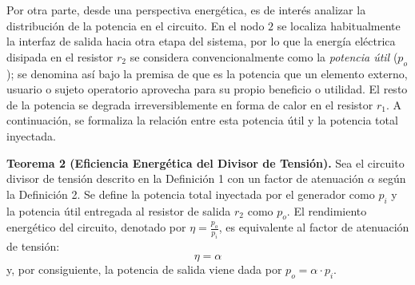 \documentclass[11pt, a4paper]{article}
\theoremstyle{definition}
\theoremstyle{plain}
\theoremstyle{plain}
\theoremstyle{remark}
\theoremstyle{remark}
\theoremstyle{remark}
\begin{document}
\noindent Por otra parte, desde una perspectiva energética, es de interés analizar la distribución de la potencia en el circuito. En el nodo $2$ se localiza habitualmente la interfaz de salida hacia otra etapa del sistema, por lo que la energía eléctrica disipada en el resistor $r_2$ se considera convencionalmente como la \textit{potencia útil} ($p_o$); se denomina así bajo la premisa de que es la potencia que un elemento externo, usuario o sujeto operatorio aprovecha para su propio beneficio o utilidad. El resto de la potencia se degrada irreversiblemente en forma de calor en el resistor $r_1$. A continuación, se formaliza la relación entre esta potencia útil y la potencia total inyectada.

\vspace{0.3cm}


\textbf{Teorema 2 (Eficiencia Energética del Divisor de Tensión).} 
Sea el circuito divisor de tensión descrito en la Definición 1 con un factor de atenuación $\alpha$ según la Definición 2. Se define la potencia total inyectada por el generador como $p_i$ y la potencia útil entregada al resistor de salida $r_2$ como $p_o$. El rendimiento energético del circuito, denotado por $\eta = \frac{p_o}{p_i}$, es equivalente al factor de atenuación de tensión:
\begin{equation}
	\eta = \alpha
\end{equation}
y, por consiguiente, la potencia de salida viene dada por $p_o = \alpha \cdot p_i$.
\end{document}
